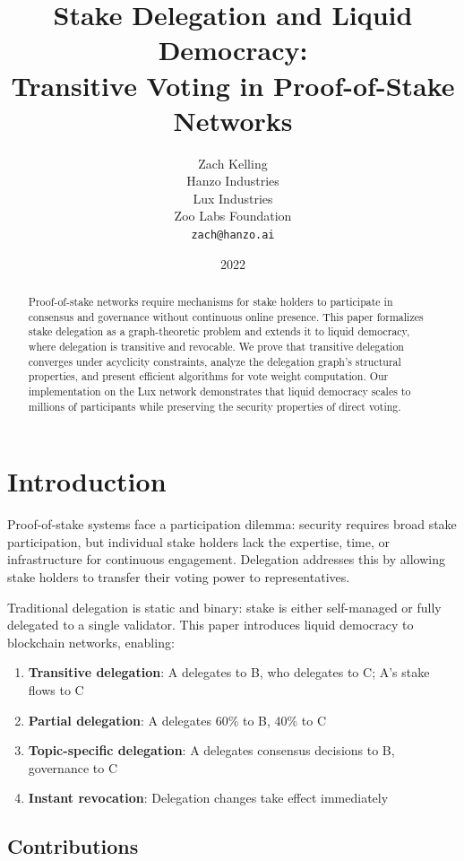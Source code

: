 \documentclass[11pt,a4paper]{article}
\title{Stake Delegation and Liquid Democracy:\\
Transitive Voting in Proof-of-Stake Networks}
\author{Zach Kelling\\
Hanzo Industries\\
Lux Industries\\
Zoo Labs Foundation\\
\texttt{zach@hanzo.ai}}
\date{2022}
\begin{document}
\maketitle

\begin{abstract}
Proof-of-stake networks require mechanisms for stake holders to participate in consensus and governance without continuous online presence. This paper formalizes stake delegation as a graph-theoretic problem and extends it to liquid democracy, where delegation is transitive and revocable. We prove that transitive delegation converges under acyclicity constraints, analyze the delegation graph's structural properties, and present efficient algorithms for vote weight computation. Our implementation on the Lux network demonstrates that liquid democracy scales to millions of participants while preserving the security properties of direct voting.
\end{abstract}

\section{Introduction}

Proof-of-stake systems face a participation dilemma: security requires broad stake participation, but individual stake holders lack the expertise, time, or infrastructure for continuous engagement. Delegation addresses this by allowing stake holders to transfer their voting power to representatives.

Traditional delegation is static and binary: stake is either self-managed or fully delegated to a single validator. This paper introduces liquid democracy to blockchain networks, enabling:

\begin{enumerate}
    \item \textbf{Transitive delegation}: A delegates to B, who delegates to C; A's stake flows to C
    \item \textbf{Partial delegation}: A delegates 60\% to B, 40\% to C
    \item \textbf{Topic-specific delegation}: A delegates consensus decisions to B, governance to C
    \item \textbf{Instant revocation}: Delegation changes take effect immediately
\end{enumerate}

\subsection{Contributions}
\end{document}
